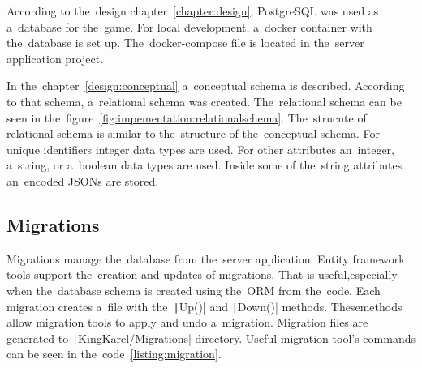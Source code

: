 According to the~design chapter~\ref{chapter:design}, PostgreSQL was used as a~database for the~game.
For local development, a~docker container with the~database is set up.
The~docker-compose file is located in the~server application project.

In the~chapter~\ref{design:conceptual} a~conceptual schema is described.
According to that schema, a~relational schema was created.
The~relational schema can be seen in the~figure~\ref{fig:impementation:relationalschema}.
The~strucute of relational schema is similar to the~structure of the~conceptual schema.
For unique identifiers integer data types are used.
For other attributes an~integer, a~string, or a~boolean data types are used.
Inside some of the~string attributes an~encoded JSONs are stored.

\subsection{Migrations}

Migrations manage the~database from the~server application.
Entity framework tools support the~creation and updates of migrations.
That is useful,\linebreak{}especially when the~database schema is created using the~ORM from the~code.
Each migration creates a~file with the~\texttt|Up()| and \texttt|Down()| methods.
These\linebreak{}methods allow migration tools to apply and undo a~migration.
Migration files are generated to \texttt|KingKarel/Migrations| directory.
Useful migration tool's commands can be seen in the~code~\ref{listing:migration}.
